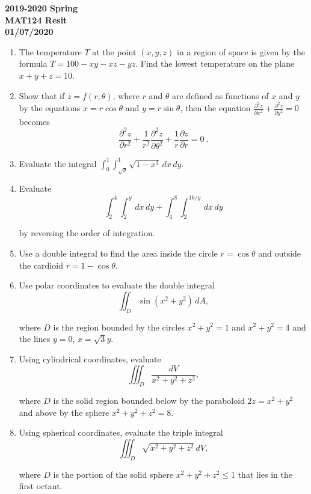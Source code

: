 \documentclass[a4paper, 12pt]{article}
\begin{document}
\newpage
{}
{}
\begin{center}
\textbf{2019-2020 Spring\\MAT124 Resit\\01/07/2020}
\end{center}

\begin{enumerate}[leftmargin=*,label=\textbf{\arabic*.}]
\item The temperature $T$ at the point $(x,y,z)$ in a region of space is given by the formula $T=100-xy-xz-yz$. Find the lowest temperature on the plane $x+y+z=10$.

\item Show that if $z=f(r, \theta)$, where $r$ and $\theta$ are defined as functions of $x$ and $y$ by the equations $x=r\cos\theta$ and $y=r\sin\theta$, then the equation $\displaystyle\frac{\partial^2z}{\partial x^2}+\frac{\partial ^2z}{\partial y^2} = 0$ becomes
\[\frac{\partial^2z}{\partial r^2}+\frac{1}{r^2}\frac{\partial^2z}{\partial\theta^2}+\frac{1}{r}\frac{\partial z}{\partial r}=0\:.\]

\item Evaluate the integral $\displaystyle \int_0^1\int_{\sqrt y}^1 \sqrt{1-x^3}\,dx\,dy$.

\item Evaluate
\[\int_2^4\int_2^y\,dx\,dy + \int_4^8\int_2^{16/y}\,dx\,dy\]

by reversing the order of integration.

\item Use a double integral to find the area inside the circle $r=\cos\theta$ and outside the cardioid $r=1-\cos\theta$.

\item Use polar coordinates to evaluate the double integral
\[\iint_D\sin\left(x^2+y^2\right)\,dA,\]

where $D$ is the region bounded by the circles $x^2+y^2=1$ and $x^2+y^2=4$ and the lines $y=0$, $x=\sqrt3 y$.

\item Using cylindrical coordinates, evaluate
\[\iiint_D\frac{dV}{x^2+y^2+z^2},\]

where $D$ is the solid region bounded below by the paraboloid $2z=x^2+y^2$ and above by the sphere $x^2+y^2+z^2=8$.

\item Using spherical coordinates, evaluate the triple integral
\[\iiint_D\sqrt{x^2+y^2+z^2}\,dV,\]

where $D$ is the portion of the solid sphere $x^2+y^2+z^2\leq1$ that lies in the first octant.
\end{enumerate}
\end{document}
